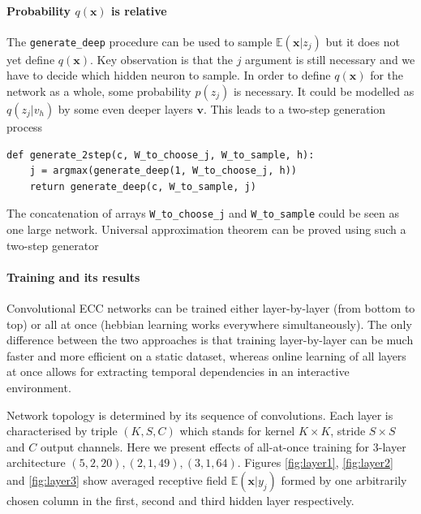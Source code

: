 \documentclass[12pt]{article}
\begin{document}
\paragraph{Probability $q(\boldsymbol{x})$ is relative} The \texttt{generate\_deep} procedure can be used to sample $\mathbb{E}(\boldsymbol{x}|z_j)$ but it does not yet define $q(\boldsymbol{x})$. Key observation is that the $j$ argument is still necessary and we have to decide which hidden neuron to sample. In order to define $q(\boldsymbol{x})$ for the network as a whole, some probability $p(z_j)$ is necessary. It could be modelled as $q(z_j|v_h)$ by some even deeper layers $\boldsymbol{v}$. This leads to a two-step generation process
\begin{lstlisting}
def generate_2step(c, W_to_choose_j, W_to_sample, h):
    j = argmax(generate_deep(1, W_to_choose_j, h))
    return generate_deep(c, W_to_sample, j)
\end{lstlisting}
The concatenation of arrays \texttt{W\_to\_choose\_j} and  \texttt{W\_to\_sample} could be seen as one large network. Universal approximation theorem can be proved using such a two-step generator
\paragraph{Training and its results}  Convolutional ECC networks can be trained either layer-by-layer (from bottom to top) or all at once (hebbian learning works everywhere simultaneously). The only difference between the two approaches is that training layer-by-layer can be much faster and more efficient on a static dataset, whereas online learning of all layers at once allows for extracting temporal dependencies in an interactive environment. 

Network topology is determined by its sequence of convolutions. Each layer is characterised by triple $(K, S, C)$ which stands for kernel $K \times K$, stride $S \times S$ and $C$ output channels. Here we present effects of all-at-once training for 3-layer architecture $(5,2,20) ,(2,1,49),  (3,1 ,64)$. Figures  \ref{fig:layer1},  \ref{fig:layer2} and  \ref{fig:layer3} show averaged receptive field $\mathbb{E}(\boldsymbol{x}|y_j)$ formed by one arbitrarily chosen column in the first, second and third hidden layer respectively.
\end{document}
